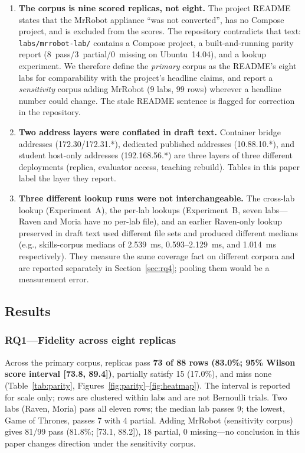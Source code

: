 \documentclass[3p,twocolumn,authoryear]{elsarticle}
\begin{document}
\begin{enumerate}
\item \textbf{The corpus is nine scored replicas, not eight.}
The project README states that the MrRobot appliance ``was not
converted'', has no Compose project, and is excluded from the scores.
The repository contradicts that text: \texttt{labs/mrrobot-lab/}
contains a Compose project, a built-and-running parity report
($8$~pass/$3$~partial/$0$~missing on Ubuntu~14.04), and a lookup
experiment. We therefore define the \emph{primary} corpus as the
README's eight labs for comparability with the project's headline
claims, and report a \emph{sensitivity} corpus adding MrRobot
($9$ labs, $99$ rows) wherever a headline number could change.
The stale README sentence is flagged for correction in the repository.
\item \textbf{Two address layers were conflated in draft text.}
Container bridge addresses (172.30/172.31.*), dedicated published
addresses (10.88.10.*), and student host-only addresses
(192.168.56.*) are three layers of three different deployments
(replica, evaluator access, teaching rebuild). Tables in this paper
label the layer they report.
\item \textbf{Three different lookup runs were not interchangeable.}
The cross-lab lookup (Experiment~A), the per-lab lookups
(Experiment~B, seven labs---Raven and Moria have no per-lab file), and
an earlier Raven-only lookup preserved in draft text used different
file sets and produced different medians (e.g., skills-corpus medians
of 2.539~ms, 0.593--2.129~ms, and 1.014~ms respectively). They measure
the same coverage fact on different corpora and are reported
separately in Section~\ref{sec:rq4}; pooling them would be a
measurement error.
\end{enumerate}

\subsection{Results}
\label{sec:eval-results}

\subsubsection{RQ1---Fidelity across eight replicas}

Across the primary corpus, replicas pass \textbf{73 of 88 rows
(83.0\%; 95\% Wilson score interval [73.8, 89.4])}, partially satisfy
15 (17.0\%), and miss none (Table~\ref{tab:parity},
Figures~\ref{fig:parity}--\ref{fig:heatmap}). The interval is reported
for scale only; rows are clustered within labs and are not Bernoulli
trials. Two labs (Raven, Moria) pass all eleven rows; the median lab
passes 9; the lowest, Game of Thrones, passes 7 with 4 partial. Adding
MrRobot (sensitivity corpus) gives 81/99 pass (81.8\%;
[73.1, 88.2]), 18 partial, 0 missing---no conclusion in this paper
changes direction under the sensitivity corpus.
\end{document}
